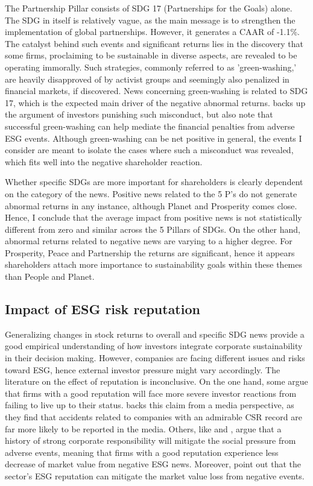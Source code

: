 The Partnership Pillar consists of SDG 17 (Partnerships for the Goals) alone. The SDG in itself is relatively vague, as the main message is to strengthen the implementation of global partnerships. However, it generates a CAAR of -1.1\%. The catalyst behind such events and significant returns lies in the discovery that some firms, proclaiming to be sustainable in diverse aspects, are revealed to be operating immorally. Such strategies, commonly referred to as 'green-washing,' are heavily disapproved of by activist groups and seemingly also penalized in financial markets, if discovered. News concerning green-washing is related to SDG 17, which is the expected main driver of the negative abnormal returns. \cite{Blancard_ESG_sentiment} backs up the argument of investors punishing such misconduct, but also note that successful green-washing can help mediate the financial penalties from adverse ESG events. Although green-washing can be net positive in general, the events I consider are meant to isolate the cases where such a misconduct was revealed, which fits well into the negative shareholder reaction.   

Whether specific SDGs are more important for shareholders is clearly dependent on the category of the news. Positive news related to the 5 P's do not generate abnormal returns in any instance, although Planet and Prosperity comes close. Hence, I conclude that the average impact from positive news is not statistically different from zero and similar across the 5 Pillars of SDGs. On the other hand, abnormal returns related to negative news are varying to a higher degree. For Prosperity, Peace and Partnership the returns are significant, hence it appears shareholders attach more importance to sustainability goals within these themes than People and Planet.    



\subsection{Impact of ESG risk reputation}

Generalizing changes in stock returns to overall and specific SDG news provide a good empirical understanding of how investors integrate corporate sustainability in their decision making. However, companies are facing different issues and risks toward ESG, hence external investor pressure might vary accordingly. 
The literature on the effect of reputation is inconclusive. On the one hand, some argue that firms with a good reputation will face more severe investor reactions from failing to live up to their status. \cite{noNewsgoodnews} backs this claim from a media perspective, as they find that accidents related to companies with an admirable CSR record are far more likely to be reported in the media. Others, like \cite{flammer2013corporate} and \cite{godfrey2009relationship}, argue that a history of strong corporate responsibility will mitigate the social pressure from adverse events, meaning that firms with a good reputation experience less decrease of market value from negative ESG news. Moreover, \cite{Blancard_ESG_sentiment} point out that the sector's ESG reputation can mitigate the market value loss from negative events.  


